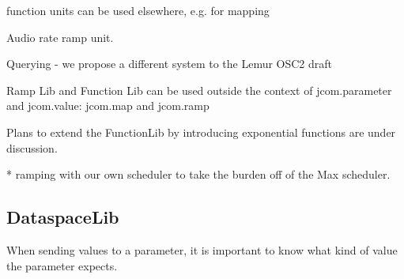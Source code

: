 \documentclass{article}
\newenvironment{packed_item}{
\begin{itemize}
  \setlength{\itemsep}{1pt}
  \setlength{\parskip}{0pt}
  \setlength{\parsep}{0pt}
}{\end{itemize}}
\begin{document}
function units can be used elsewhere, e.g. for mapping

Audio rate ramp unit.



Querying - we propose a different system to the Lemur OSC2 draft

Ramp Lib and Function Lib can be used outside the context of jcom.parameter and jcom.value: jcom.map and jcom.ramp


Plans to extend the FunctionLib by introducing exponential functions are under discussion. %


* ramping with our own scheduler to take the burden off of the Max scheduler.


\subsection{DataspaceLib} %
\label{sec:dataspacelib}

When sending values to a parameter, it is important to know what kind of value the parameter expects.

%
%	
%
\end{document}
